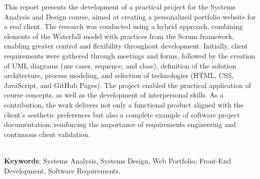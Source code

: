 \begin{thesisabastract}
This report presents the development of a practical project for the Systems Analysis and Design course, aimed at creating a personalized portfolio website for a real client. The research was conducted using a hybrid approach, combining elements of the Waterfall model with practices from the Scrum framework, enabling greater control and flexibility throughout development. Initially, client requirements were gathered through meetings and forms, followed by the creation of UML diagrams (use cases, sequence, and class), definition of the solution architecture, process modeling, and selection of technologies (HTML, CSS, JavaScript, and GitHub Pages). The project enabled the practical application of course concepts, as well as the development of interpersonal skills. As a contribution, the work delivers not only a functional product aligned with the client's aesthetic preferences but also a complete example of software project documentation, reinforcing the importance of requirements engineering and continuous client validation. 

\ \\


\textbf{Keywords}: Systems Analysis, Systems Design, Web Portfolio, Front-End Development, Software Requirements.

\end{thesisabastract}
